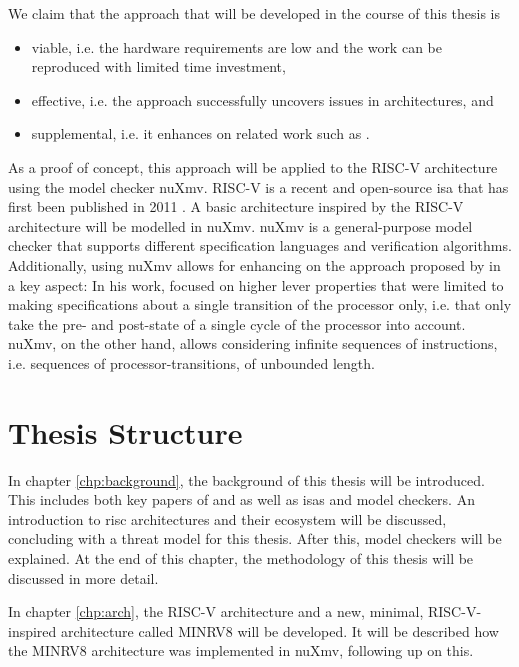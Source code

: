 We claim that the approach that will be developed in the course of this thesis is
\begin{itemize}
    \item viable, i.e. the hardware requirements are low and the work can be reproduced with limited time investment,
    \item effective, i.e. the approach successfully uncovers issues in architectures, and
    \item supplemental, i.e. it enhances on related work such as \cite{Reid17}.
\end{itemize}

As a proof of concept, this approach will be applied to the RISC-V architecture using the model checker nuXmv.
RISC-V is a recent and open-source \gls{isa} that has first been published in 2011 \cite{RiscVISA-org}.
A basic architecture inspired by the RISC-V architecture will be modelled in nuXmv.
nuXmv is a general-purpose model checker that supports different specification languages and verification algorithms.
Additionally, using nuXmv allows for enhancing on the approach proposed by \citeauthor{Reid17} in a key aspect:
In his work, \citeauthor{Reid17} focused on higher lever properties that were limited to making specifications about a single transition of the processor only, i.e. that only take the pre- and post-state of a single cycle of the processor into account.
nuXmv, on the other hand, allows considering infinite sequences of instructions, i.e. sequences of processor-transitions, of unbounded length.

\section{Thesis Structure}

In chapter \ref{chp:background}, the background of this thesis will be introduced.
This includes both key papers of \citeauthor{Reid17} and \citeauthor{Ferraiuolo17} as well as \glspl{isa} and model checkers.
An introduction to \gls{risc} architectures and their ecosystem will be discussed, concluding with a threat model for this thesis.
After this, model checkers will be explained.
At the end of this chapter, the methodology of this thesis will be discussed in more detail.

In chapter \ref{chp:arch}, the RISC-V architecture and a new, minimal, RISC-V-inspired architecture called MINRV8 will be developed.
It will be described how the MINRV8 architecture was implemented in nuXmv, following up on this.

